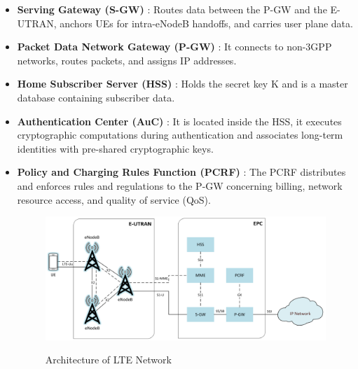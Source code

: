 \documentclass[conference]{IEEEtran}
\begin{document}
\begin{itemize}
\begin{itemize}
        \item \textbf{Serving Gateway (S-GW)} : Routes data between the P-GW and the E-UTRAN, anchors UEs for intra-eNodeB handoffs, and carries user plane data\cite{cichonski2016guide}.

        \item \textbf{Packet Data Network Gateway (P-GW) } : It connects to non-3GPP networks, routes packets, and assigns IP addresses\cite{cichonski2016guide}.

        \item \textbf{Home Subscriber Server (HSS) } : Holds the secret key K and is a master database containing subscriber data\cite{cichonski2016guide}.

        \item \textbf{Authentication Center (AuC) } : It is located inside the HSS, it executes cryptographic computations during authentication and associates long-term identities with pre-shared cryptographic keys\cite{cichonski2016guide}.

        \item \textbf{Policy and Charging Rules Function (PCRF) } : The PCRF distributes and enforces rules and regulations to the P-GW concerning billing, network resource access, and quality of service (QoS)\cite{cichonski2016guide}.

\begin{figure}
            \centering
            \includegraphics[width=0.9\linewidth]{Assets/lte_architecture.png}
            \caption{Architecture of LTE Network} \cite{cichonski2016guide}
            \label{fig:lte_architecture}
        \end{figure}
    \end{itemize}
    
\end{itemize}
\end{document}
